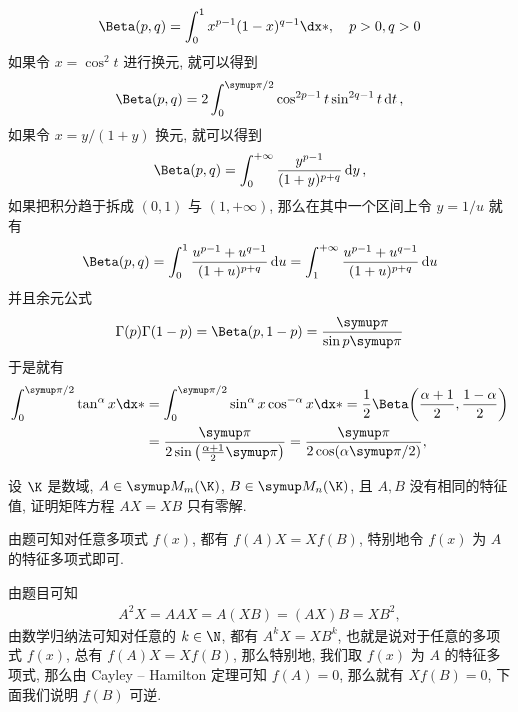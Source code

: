 \begin{exercise}[series=exer]
\begin{answer}
\begin{align*}
          \Beta(p, q) = \int_{0}^{1} x^{p - 1}(1 - x)^{q - 1} \dx*,\quad p > 0, q > 0
      \end{align*}
      如果令 $ x = \cos^{2} t $ 进行换元, 就可以得到
      \begin{align*}
          \Beta(p, q) = 2 \int_{0}^{\pi/2} \cos^{2p - 1}t \sin^{2q-1} t \dd{t},
      \end{align*}
      如果令 $ x = y/(1 + y) $ 换元, 就可以得到
      \begin{align*}
          \Beta(p, q) = \int_{0}^{+\infty} \frac{y^{p - 1}}{(1 + y)^{p + q}} \dd{y},
      \end{align*}
      如果把积分趋于拆成 $ (0, 1) $ 与 $ (1, +\infty) $, 那么在其中一个区间上令 $ y = 1/u $ 就有
      \begin{align*}
          \Beta(p, q) = \int_{0}^{1} \frac{u^{p - 1} + u^{q - 1}}{(1 + u)^{p + q}} \dd{u} = \int_{1}^{+\infty} \frac{u^{p - 1} + u^{q - 1}}{(1 + u)^{p + q}} \dd{u}
      \end{align*}
      并且余元公式
      \begin{align*}
          \Gamma(p)\Gamma(1 - p) = \Beta(p, 1 - p) = \frac{\pi}{\sin p\pi}
      \end{align*}
      于是就有
      \begin{align*}
          \int_{0}^{\pi/2} \tan^{\alpha}x \dx* & = \int_{0}^{\pi/2} \sin^{\alpha}x\cos^{-\alpha}x \dx* = \frac{1}{2}\Beta\qty(\frac{\alpha + 1}{2}, \frac{1 - \alpha}{2}) \\
                                                  & = \frac{\pi}{2\sin\qty(\frac{\alpha + 1}{2}\pi)} = \frac{\pi}{2\cos(\alpha\pi/2)},
      \end{align*}
  \end{answer}
  \sitem\label{item:AX=XB} 设 $ \K $ 是数域, $ A \in \MM[\K][m] $, $ B \in \MM[\K][n] $, 且 $ A, B $ 没有相同的特征值, 证明矩阵方程 $ AX = XB $ 只有零解.
  \begin{hint}
      由题可知对任意多项式 $ f(x) $, 都有 $ f(A)X = Xf(B) $, 特别地令 $ f(x) $ 为 $ A $ 的特征多项式即可.
  \end{hint}
  \begin{answer}
      由题目可知
      \begin{align*}
          A^{2}X = AAX = A(XB) = (AX)B = XB^{2},
      \end{align*}
      由数学归纳法可知对任意的 $ k \in \N $, 都有 $ A^{k}X = XB^{k} $, 也就是说对于任意的多项式 $ f(x) $, 总有 $ f(A)X = Xf(B) $, 那么特别地, 我们取 $ f(x) $ 为 $ A $ 的特征多项式, 那么由 Cayley -- Hamilton 定理可知 $ f(A) = 0 $, 那么就有 $ Xf(B) = 0 $, 下面我们说明 $ f(B) $ 可逆.


\end{answer}
\end{exercise}
